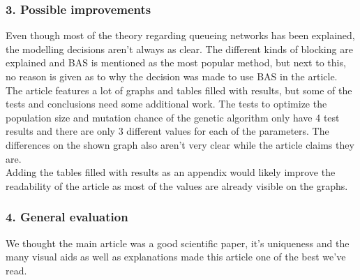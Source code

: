 \documentclass[twoside]{article}
\begin{document}
\begin{multicols}{2}
\subsubsection*{3. Possible improvements}
Even though most of the theory regarding queueing networks has been explained, the modelling decisions aren't always as clear. The different kinds of blocking are explained and BAS is mentioned as the most popular method, but next to this, no reason is given as to why the decision was made to use BAS in the article. The article features a lot of graphs and tables filled with results, but some of the tests and conclusions need some additional work. The tests to optimize the population size and mutation chance of the genetic algorithm only have 4 test results and there are only 3 different values for each of the parameters. The differences on the shown graph also aren't very clear while the article claims they are.\\ Adding the tables filled with results as an appendix would likely improve the readability of the article as most of the values are already visible on the graphs.
\subsubsection*{4. General evaluation}
We thought the main article was a good scientific paper, it's uniqueness and the many visual aids as well as explanations made this article one of the best we've read.
\end{multicols}
\end{document}
